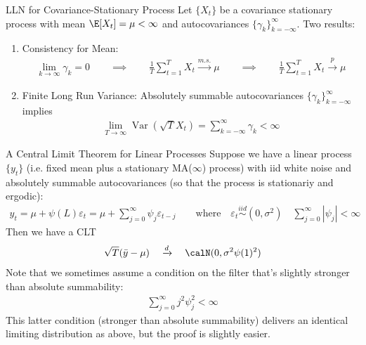 \documentclass[aspectratio=169, handout]{beamer}
\newcommand{\ra}{\rightarrow}
\newcommand{\iid}{\overset{iid}{\sim}}
\newcommand{\Var}{\operatorname{Var}}
\newcommand{\pto}{\xrightarrow{p}}
\newcommand{\msto}{\xrightarrow{m.s.}}
\newcommand{\dto}{\xrightarrow{d}}
\begin{document}
{\footnotesize
\begin{frame}{LLN for Covariance-Stationary Process}
Let $\{X_t\}$ be a covariance stationary process
with mean $\E[X_t]=\mu<\infty$ and autocovariances
$\{\gamma_k\}_{k=-\infty}^\infty$.
Two results:
\begin{enumerate}
  \item
    \alert{Consistency for Mean}:
    \begin{align*}
      \lim_{k\ra \infty} \gamma_k=0
      \qquad\implies\qquad
      \frac{1}{T}
      \sum_{t=1}^T
      X_t
      \msto \mu
      \qquad\implies\qquad
      \frac{1}{T}
      \sum_{t=1}^T
      X_t
      \pto
      \mu
    \end{align*}

  \item
    \alert{Finite Long Run Variance}:
    Absolutely summable autocovariances $\{\gamma_k\}_{k=-\infty}^\infty$
    implies
    \begin{align*}
      \lim_{T\ra \infty}
      \Var(\sqrt{T}X_t)
      =
      \sum_{k=-\infty}^\infty
      \gamma_k
      < \infty
    \end{align*}


\end{enumerate}
\end{frame}
}


{\footnotesize
\begin{frame}{A Central Limit Theorem for Linear Processes}
Suppose we have a \alert{linear process} $\{y_t\}$ (i.e. fixed mean plus
a stationary MA($\infty$) process)
with iid white noise and absolutely summable autocovariances (so that
the process is stationariy and ergodic):
\begin{align*}
  y_t
  = \mu + \psi(L)\varepsilon_t
  = \mu + \sum_{j=0}^\infty \psi_j \varepsilon_{t-j}
  \qquad\text{where}\quad
  \varepsilon_t
  \iid
  (0,\sigma^2)
  \quad
  \sum_{j=0}^\infty |\psi_j|<\infty
\end{align*}
\pause
Then we have a CLT
\begin{align*}
  \sqrt{T}(\bar{y}-\mu)
  \quad\dto\quad
  \calN(0,\sigma^2\psi(1)^2)
\end{align*}
\pause
Note that we sometimes assume a condition on the filter that's slightly
stronger than absolute summability:
\begin{align*}
  \sum_{j=0}^\infty j^2 \psi_j^2<\infty
\end{align*}
This latter condition (stronger than absolute summability) delivers an
identical limiting distribution as above, but the proof is slightly
easier.
\end{frame}
}
\end{document}
